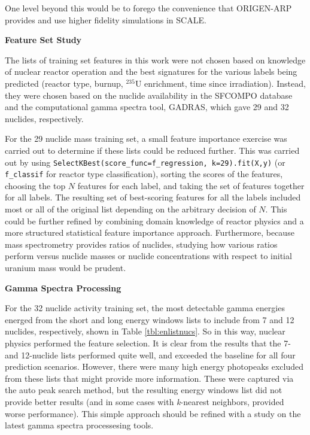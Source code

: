 One level beyond this would be to forego the convenience that \gls{ORIGEN-ARP}
provides and use higher fidelity simulations in \gls{SCALE}. 

\noindent \textbf{Feature Set Study}

The lists of training set features in this work were not chosen based on
knowledge of nuclear reactor operation and the best signatures for the various
labels being predicted (reactor type, burnup, ${}^{235}\text{U}$ enrichment,
time since irradiation).  Instead, they were chosen based on the nuclide
availability in the \gls{SFCOMPO} database and the computational gamma spectra
tool, \gls{GADRAS}, which gave 29 and 32 nuclides, respectively. 

For the 29 nuclide mass training set, a small feature importance exercise was
carried out to determine if these lists could be reduced further. This was
carried out by using \texttt{SelectKBest(score\_func=f\_regression,
k=29).fit(X,y)} (or \texttt{f\_classif} for reactor type classification),
sorting the scores of the features, choosing the top $N$ features for each
label, and taking the set of features together for all labels.  The resulting
set of best-scoring features for all the labels included most or all of the
original list depending on the arbitrary decision of $N$.  This could be
further refined by combining domain knowledge of reactor physics and a more
structured statistical feature importance approach. Furthermore, because mass
spectrometry provides ratios of nuclides, studying how various ratios perform
versus nuclide masses or nuclide concentrations with respect to initial uranium
mass would be prudent. 

\noindent \textbf{Gamma Spectra Processing}

For the 32 nuclide activity training set, the most detectable gamma energies
energed from the short and long energy windows lists to include from 7 and 12
nuclides, respectively, shown in Table \ref{tbl:enlistnucs}. So in this way,
nuclear physics performed the feature selection.  It is clear from the results
that the 7- and 12-nuclide lists performed quite well, and exceeded the
baseline for all four prediction scenarios.  However, there were many high
energy photopeaks excluded from these lists that might provide more
information. These were captured via the auto peak search method, but the
resulting energy windows list did not provide better results (and in some cases
with \textit{k}-nearest neighbors, provided worse performance).  This simple
approach should be refined with a study on the latest gamma spectra
processesing tools. 

